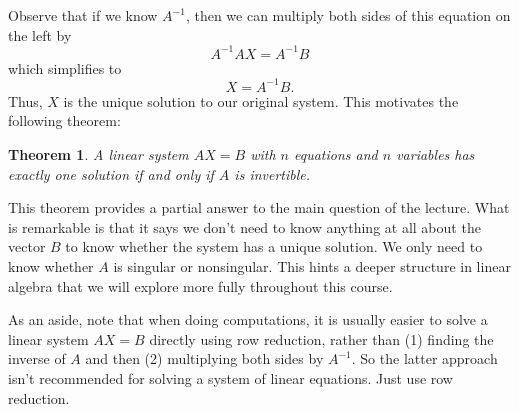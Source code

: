 \documentclass[10pt]{article}
\newtheorem{theorem}{Theorem}
\theoremstyle{definition}
\begin{document}
Observe that if we know $A^{-1}$, then we can multiply both sides of this
equation on the left by
\begin{equation*}
  A^{-1}AX = A^{-1}B
\end{equation*}
which simplifies to
\begin{equation}\label{eq:inverse-solution-to-linear-equation}
  X = A^{-1}B.
\end{equation}
Thus, $X$ is the unique solution to our original system. This motivates the
following theorem:
\begin{theorem}
  \label{thm:unique-solution-invertibility}
  A linear system $AX=B$ with $n$ equations and $n$ variables has exactly one
  solution if and only if $A$ is invertible.
\end{theorem}

This theorem provides a partial answer to the main question of the lecture.
What is remarkable is that it says we don't need to know anything at all about
the vector $B$ to know whether the system has a unique solution. We only need
to know whether $A$ is singular or nonsingular. This hints a deeper structure
in linear algebra that we will explore more fully throughout this course.

As an aside, note that when doing computations, it is usually easier to solve
a linear system $AX=B$ directly using row reduction, rather than (1) finding
the inverse of $A$ and then (2) multiplying both sides by $A^{-1}$. So the
latter approach isn't recommended for solving a system of linear equations.
Just use row reduction.
\end{document}
